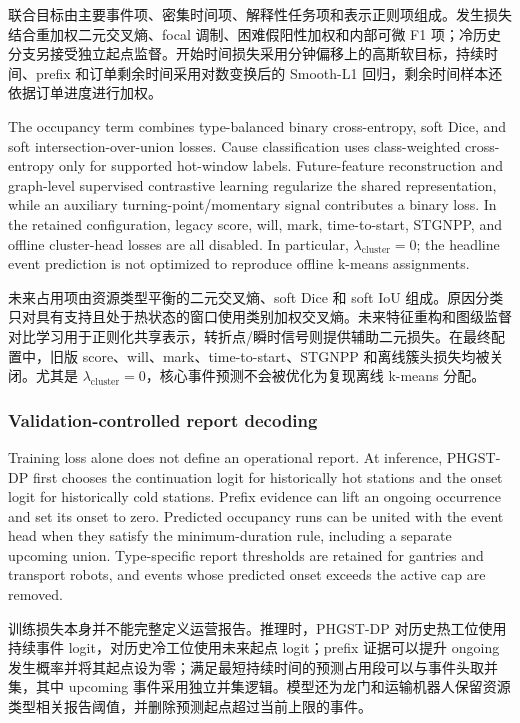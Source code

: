 \documentclass[a4paper,fleqn]{cas-dc}
\newcommand{\zhpara}[1]{%
  \par\begingroup\small\color{black!72}\noindent #1\par\endgroup}
\begin{document}
\zhpara{联合目标由主要事件项、密集时间项、解释性任务项和表示正则项组成。发生损失结合重加权二元交叉熵、focal 调制、困难假阳性加权和内部可微 F1 项；冷历史分支另接受独立起点监督。开始时间损失采用分钟偏移上的高斯软目标，持续时间、prefix 和订单剩余时间采用对数变换后的 Smooth-L1 回归，剩余时间样本还依据订单进度进行加权。}

The occupancy term combines type-balanced binary cross-entropy, soft Dice, and soft intersection-over-union losses. Cause classification uses class-weighted cross-entropy only for supported hot-window labels. Future-feature reconstruction and graph-level supervised contrastive learning regularize the shared representation, while an auxiliary turning-point/momentary signal contributes a binary loss. In the retained configuration, legacy score, will, mark, time-to-start, STGNPP, and offline cluster-head losses are all disabled. In particular, $\lambda_{\mathrm{cluster}}=0$; the headline event prediction is not optimized to reproduce offline k-means assignments.

\zhpara{未来占用项由资源类型平衡的二元交叉熵、soft Dice 和 soft IoU 组成。原因分类只对具有支持且处于热状态的窗口使用类别加权交叉熵。未来特征重构和图级监督对比学习用于正则化共享表示，转折点/瞬时信号则提供辅助二元损失。在最终配置中，旧版 score、will、mark、time-to-start、STGNPP 和离线簇头损失均被关闭。尤其是 $\lambda_{\mathrm{cluster}}=0$，核心事件预测不会被优化为复现离线 k-means 分配。}

\subsubsection{Validation-controlled report decoding}

Training loss alone does not define an operational report. At inference, PHGST-DP first chooses the continuation logit for historically hot stations and the onset logit for historically cold stations. Prefix evidence can lift an ongoing occurrence and set its onset to zero. Predicted occupancy runs can be united with the event head when they satisfy the minimum-duration rule, including a separate upcoming union. Type-specific report thresholds are retained for gantries and transport robots, and events whose predicted onset exceeds the active cap are removed.

\zhpara{训练损失本身并不能完整定义运营报告。推理时，PHGST-DP 对历史热工位使用持续事件 logit，对历史冷工位使用未来起点 logit；prefix 证据可以提升 ongoing 发生概率并将其起点设为零；满足最短持续时间的预测占用段可以与事件头取并集，其中 upcoming 事件采用独立并集逻辑。模型还为龙门和运输机器人保留资源类型相关报告阈值，并删除预测起点超过当前上限的事件。}
\end{document}
